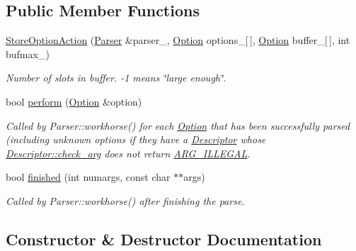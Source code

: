 \subsection*{Public Member Functions}
\begin{DoxyCompactItemize}
\item 
\hyperlink{classoption_1_1Parser_1_1StoreOptionAction_aaa638cdd712202e3e10471d4299f7f9d}{Store\+Option\+Action} (\hyperlink{classoption_1_1Parser}{Parser} \&parser\+\_\+, \hyperlink{classoption_1_1Option}{Option} options\+\_\+\mbox{[}$\,$\mbox{]}, \hyperlink{classoption_1_1Option}{Option} buffer\+\_\+\mbox{[}$\,$\mbox{]}, int bufmax\+\_\+)
\begin{DoxyCompactList}\small\item\em Number of slots in {\ttfamily buffer}. {\ttfamily -\/1} means \char`\"{}large enough\char`\"{}. \end{DoxyCompactList}\item 
bool \hyperlink{classoption_1_1Parser_1_1StoreOptionAction_a8931919fba5516377c202920db2b2f84}{perform} (\hyperlink{classoption_1_1Option}{Option} \&option)
\begin{DoxyCompactList}\small\item\em Called by Parser\+::workhorse() for each \hyperlink{classoption_1_1Option}{Option} that has been successfully parsed (including unknown options if they have a \hyperlink{structoption_1_1Descriptor}{Descriptor} whose \hyperlink{structoption_1_1Descriptor_aa5d675dba0214a4abd73007ff163cc67}{Descriptor\+::check\+\_\+arg} does not return \hyperlink{namespaceoption_aee8c76a07877335762631491e7a5a1a9a9528e32563b795bd2930b12d0a5e382d}{A\+R\+G\+\_\+\+I\+L\+L\+E\+G\+AL}. \end{DoxyCompactList}\item 
bool \hyperlink{classoption_1_1Parser_1_1StoreOptionAction_a617f675ef50a72ae36ce91f065bc8441}{finished} (int numargs, const char $\ast$$\ast$args)
\begin{DoxyCompactList}\small\item\em Called by Parser\+::workhorse() after finishing the parse. \end{DoxyCompactList}\end{DoxyCompactItemize}


\subsection{Constructor \& Destructor Documentation}
